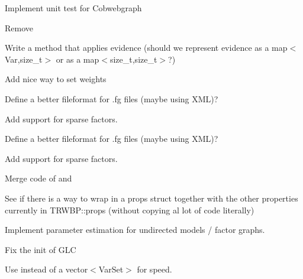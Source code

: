 \begin{DoxyRefList}
%
Implement unit test for Cobwebgraph  
\item[Member \doxylink{structdai_1_1CobwebGraph_1_1Connection_a9072dfec3d0281668d29a5b3efdd8d6f}{dai\+::Cobweb\+Graph\+::Connection\+::newmsg} ]\label{todo__todo000010}%
%
Remove   
\item[Class \doxylink{classdai_1_1FactorGraph}{dai\+::Factor\+Graph} ]\label{todo__todo000014}%
%
Write a method that applies evidence (should we represent evidence as a map$<$\+Var,size\+\_\+t$>$ or as a map$<$size\+\_\+t,size\+\_\+t$>$?)  
\item[Class \doxylink{classdai_1_1FBP}{dai\+::FBP} ]\label{todo__todo000015}%
%
Add nice way to set weights  
\item[Class \doxylink{classdai_1_1TFactor}{dai\+::TFactor\texorpdfstring{$<$}{<} T \texorpdfstring{$>$}{>}} ]\label{todo__todo000012}%
%
Define a better fileformat for .fg files (maybe using XML)? 



Add support for sparse factors. 

\label{todo__todo000013}%
%
Define a better fileformat for .fg files (maybe using XML)? 



Add support for sparse factors.  
\item[Class \doxylink{classdai_1_1TRWBP}{dai\+::TRWBP} ]\label{todo__todo000019}%
%
Merge code of  and   
\item[Member \doxylink{classdai_1_1TRWBP_aa53430394d674704ec20cd3272c4b528}{dai\+::TRWBP\+::nrtrees} ]\label{todo__todo000020}%
%
See if there is a way to wrap  in a props struct together with the other properties currently in TRWBP\+::props (without copying al lot of  code literally)  
\item[File \doxylink{emalg_8h}{emalg.h} ]\label{todo__todo000011}%
%
Implement parameter estimation for undirected models / factor graphs.  
\item[File \doxylink{glc_8h}{glc.h} ]\label{todo__todo000016}%
%
Fix the init of GLC  
\item[File \doxylink{hak_8h}{hak.h} ]\label{todo__todo000017}%
%
Use  instead of a vector$<$\+Var\+Set$>$ for speed. 




\end{DoxyRefList}
